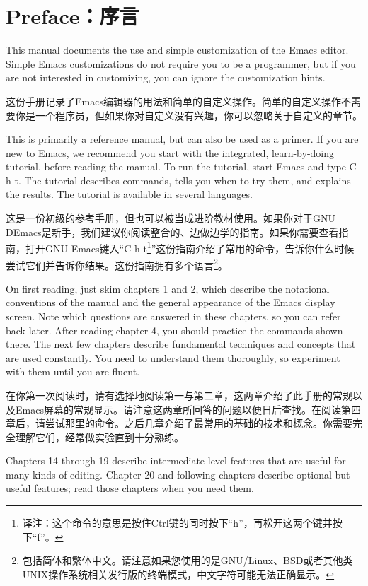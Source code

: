\chapter{Preface：序言}
This manual documents the use and simple customization of the Emacs editor. Simple Emacs customizations do not  require you to be a programmer, but if you are not interested in customizing, you can ignore the customization hints.\par
这份手册记录了Emacs编辑器的用法和简单的自定义操作。简单的自定义操作不需要你是一个程序员，但如果你对自定义没有兴趣，你可以忽略关于自定义的章节。\par
This is primarily a reference manual, but can also be used as a primer. If you are new to Emacs, we recommend you start with the integrated, learn-by-doing tutorial, before reading the manual. To run the tutorial, start Emacs and type C-h t. The tutorial describes commands, tells you when to try them, and explains the results. The tutorial is available in several languages.\par
这是一份初级的参考手册，但也可以被当成进阶教材使用。如果你对于GNU DEmacs是新手，我们建议你阅读整合的、边做边学的指南。如果你需要查看指南，打开GNU Emacs键入“C-h t\footnote{译注：这个命令的意思是按住Ctrl键的同时按下“h”，再松开这两个键并按下“f”。}”这份指南介绍了常用的命令，告诉你什么时候尝试它们并告诉你结果。这份指南拥有多个语言\footnote{包括简体和繁体中文。请注意如果您使用的是GNU/Linux、BSD或者其他类UNIX操作系统相关发行版的终端模式，中文字符可能无法正确显示。}。\par
On first reading, just skim chapters 1 and 2, which describe the notational conventions of the manual and the general appearance of the Emacs display screen. Note which questions are answered in these chapters, so you can refer back later. After reading chapter 4, you should practice the commands shown there. The next few chapters describe fundamental techniques and concepts that are used constantly. You need to understand them thoroughly, so experiment with them until you are fluent.\par
在你第一次阅读时，请有选择地阅读第一与第二章，这两章介绍了此手册的常规以及Emacs屏幕的常规显示。请注意这两章所回答的问题以便日后查找。在阅读第四章后，请尝试那里的命令。之后几章介绍了最常用的基础的技术和概念。你需要完全理解它们，经常做实验直到十分熟练。\par
Chapters 14 through 19 describe intermediate-level features that are useful for many kinds of editing. Chapter 20 and following chapters describe optional but useful features; read those chapters when you need them.\par
